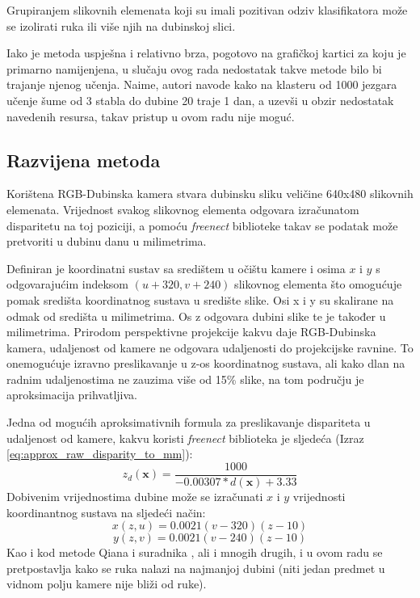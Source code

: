 \documentclass[times, utf8, diplomski, numeric]{fer}
\begin{document}
Grupiranjem slikovnih elemenata koji su imali pozitivan odziv klasifikatora može se izolirati ruka ili više njih na dubinskoj slici.

Iako je metoda uspješna i relativno brza, pogotovo na grafičkoj kartici za koju je primarno namijenjena, u slučaju ovog rada nedostatak takve metode bilo bi trajanje njenog učenja. Naime, autori navode kako na klasteru od 1000 jezgara učenje šume od 3 stabla do dubine 20 traje 1 dan, a uzevši u obzir nedostatak navedenih resursa, takav pristup u ovom radu nije moguć.

\subsection{Razvijena metoda}

Korištena RGB-Dubinska kamera stvara dubinsku sliku veličine 640x480 slikovnih elemenata. Vrijednost svakog slikovnog elementa odgovara izračunatom disparitetu na toj poziciji, a pomoću \textit{freenect} biblioteke takav se podatak može pretvoriti u dubinu danu u milimetrima.

Definiran je koordinatni sustav sa središtem u očištu kamere i osima $x$ i $y$ s odgovarajućim indeksom $(u+320,v+240)$ slikovnog elementa što omogućuje pomak središta koordinatnog sustava u središte slike. Osi x i y su skalirane na odmak od središta u milimetrima. Os z odgovara dubini slike te je također u milimetrima. Prirodom perspektivne projekcije kakvu daje RGB-Dubinska kamera, udaljenost od kamere ne odgovara udaljenosti do projekcijske ravnine. To onemogućuje izravno preslikavanje u z-os koordinatnog sustava, ali kako dlan na radnim udaljenostima ne zauzima više od 15\% slike, na tom području je aproksimacija prihvatljiva.

Jedna od mogućih aproksimativnih formula za preslikavanje dispariteta u udaljenost od kamere, kakvu koristi \textit{freenect} biblioteka \cite{openkinect} je sljedeća (Izraz \ref{eq:approx_raw_disparity_to_mm}):
\begin{equation}
	\label{eq:approx_raw_disparity_to_mm}
	z_{d}(\mathbf{x})=\frac{1000}{-0.00307*d(\mathbf{x})+3.33}
\end{equation}
Dobivenim vrijednostima dubine može se izračunati $x$ i $y$ vrijednosti koordinantnog sustava na sljedeći način:
\begin{equation}
	\label{eq:raw_disparity_to_mm_x}
	    x(z,u)=0.0021(v - 320)(z-10) 
\end{equation}
\begin{equation}
	\label{eq:raw_disparity_to_mm_y}
	    y(z,v)=0.0021(v - 240)(z-10)
\end{equation}
Kao i kod metode Qiana i suradnika \cite{qian2014realtime}, ali i mnogih drugih, i u ovom radu se pretpostavlja kako se ruka nalazi na najmanjoj dubini (niti jedan predmet u vidnom polju kamere nije bliži od ruke).
\end{document}
